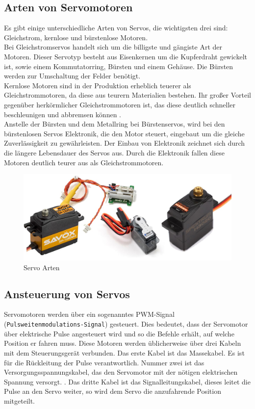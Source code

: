 \subsection{Arten von Servomotoren}
Es gibt einige unterschiedliche Arten von Servos, die wichtigsten drei sind: Gleichstrom, kernlose und bürstenlose Motoren. \\
Bei Gleichstromservos handelt sich um die billigste und gängiste Art der Motoren. Dieser Servotyp besteht aus Eisenkernen um die Kupferdraht gewickelt ist, sowie einem Kommutatorring, Bürsten und einem Gehäuse. Die Bürsten werden zur Umschaltung der Felder benötigt. \\
Kernlose Motoren sind in der Produktion erheblich teuerer als Gleichstrommotoren, da diese aus teurern Materialien bestehen. Ihr großer Vorteil gegenüber herkörmlicher Gleichstrommotoren ist, das diese deutlich schneller beschleunigen und abbremsen können \parencite{ServomotorArten}. \\
Anstelle der Bürsten und dem Metallring bei Bürstenservos, wird bei den bürstenlosen Servos Elektronik, die den Motor steuert, eingebaut um die gleiche Zuverlässigkeit zu gewährleisten. Der Einbau von Elektronik zeichnet sich durch die längere Lebensdauer des Servos aus. Durch die Elektronik fallen diese Motoren deutlich teurer aus als Gleichstrommotoren. \\

\begin{figure}[H]
	\centering
	\includegraphics[width=0.5\linewidth]{images/ServoArten.jpg}
	\caption[Servo Arten]{Servo Arten}
	\label{fig:Servo Arten}
\end{figure}


\newpage
\subsection{Ansteuerung von Servos}
Servomotoren werden über ein sogenanntes PWM-Signal (\texttt{Pulsweitenmodulations-Signal}) gesteuert. Dies bedeutet, dass der Servomotor über elektrische Pulse angesteuert wird und so die Befehle erhält, auf welche Position er fahren muss. Diese Motoren werden üblicherweise über drei Kabeln mit dem Steuerungsgerät verbunden. Das erste Kabel ist das Massekabel. Es ist für die Rückleitung der Pulse verantwortlich. Nummer zwei ist das Versorgungsspannungskabel, das den Servomotor mit der nötigen elektrischen Spannung versorgt. \parencite{ServomotorAnsteuerung}. Das dritte Kabel ist das Signalleitungskabel, dieses  leitet die Pulse an den Servo weiter, so wird dem Servo die anzufahrende Position mitgeteilt.\\


